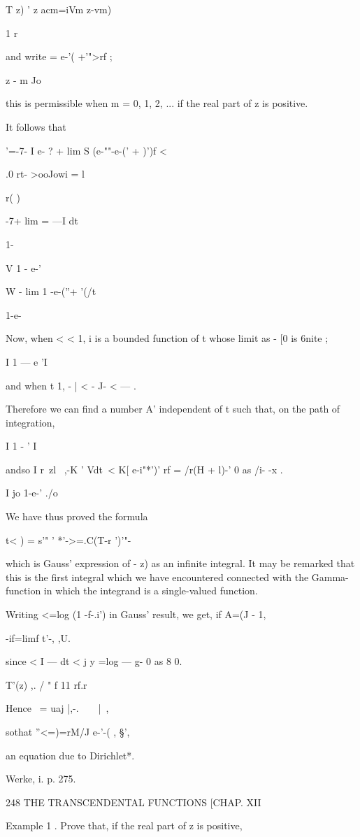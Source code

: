 T z) ' z acm=iVm z-vm)

1 r

and write = e-'( +'">rf ;

z - m Jo

this is permissible when m = 0, 1, 2, ... if the real part of z is
positive.

It follows that

 '=-7- I e- ? + lim S (e-""-e-(' + )')f <

.0 rt- >ooJowi = l

r( )

-7+ lim = —I dt

1-

V 1 - e-'

W - lim 1 -e-(''+ '(/t

1-e-

Now, when < < 1, i is a bounded function of t whose limit as - [0 is
6nite ;

I 1 — e 'I

and when t 1, - | < - J- < — .

Therefore we can find a number A' independent of t such that, on the
path of integration,

I 1 - ' I

andso I r\ zl~ ,-K ' Vdt\ < K[ e-i"*')' rf = /r(H + l)-' 0 as /i- -x .

I jo 1-e-' ./o

We have thus proved the formula

t< ) = s'" ' *'->=.C(T-r ')'"-

which is Gauss' expression of - z) as an infinite integral. It may be
remarked that this is the first integral which we have encountered
connected with the Gamma-function in which the integrand is a
single-valued function.

Writing <=log (1 -f-.i') in Gauss' result, we get, if A=(J - 1,

 -if=limf t'-, ,U.

since < I — dt < j y =log — g- 0 as 8 0.

T'(z) ,. / " f 11 rf.r

Hence \ = uaj |,-.\ \ \ \ |\ ,

sothat ''<=)=rM/J e-'-( , §',

an equation due to Dirichlet*.

Werke, i. p. 275.

248 THE TRANSCENDENTAL FUNCTIONS [CHAP. XII

Example 1 . Prove that, if the real part of z is positive,

